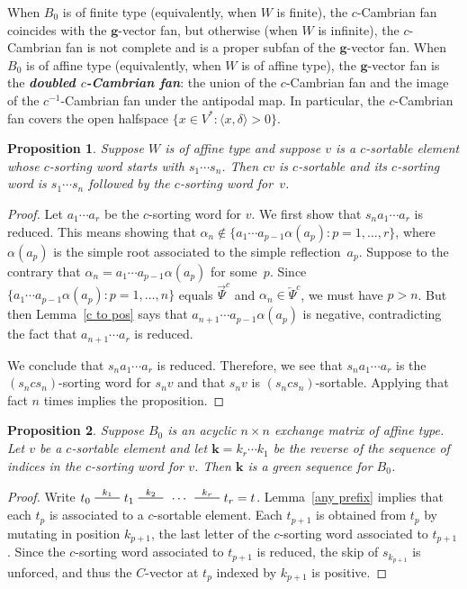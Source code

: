 \documentclass{amsart}
\newtheorem{proposition}{Proposition}[section]
\theoremstyle{definition}
\theoremstyle{remark}
\numberwithin{equation}{section}
\newcommand{\newword}[1]{\textbf{\emph{#1}}}
\newcommand{\edge}{\,\,\rule[2.7pt]{20pt}{0.5pt}\,\,}
\newcommand{\set}[1]{{\lbrace #1 \rbrace}}
\newcommand{\br}[1]{{\langle #1 \rangle}}
\newcommand{\0}{{\mathbf{0}}}
\newcommand{\g}{\mathbf{g}}
\newcommand{\kk}{{\boldsymbol{k}}}
\newcommand{\TravInfChar}{\Psi}
\newcommand{\TravProj}[1]{\overrightarrow{\TravInfChar}^{#1}}
\newcommand{\TravInj}[1]{\overleftarrow{\TravInfChar}^{#1}}
\begin{document}
When $B_0$ is of finite type (equivalently, when $W$ is finite), the $c$-Cambrian fan coincides with the $\g$-vector fan, but otherwise (when $W$ is infinite), the $c$-Cambrian fan is not complete and is a proper subfan of the $\g$-vector fan.
When $B_0$ is of affine type (equivalently, when $W$ is of affine type), the $\g$-vector fan is the \newword{doubled $c$-Cambrian fan}: the union of the \mbox{$c$-Cambrian} fan and the image of the \mbox{$c^{-1}$-Cambrian} fan under the antipodal map.  %
In particular, the $c$-Cambrian fan covers the open halfspace $\set{x\in V^*:\br{x,\delta}>0}$.

\begin{proposition}\label{tack on c}
Suppose $W$ is of affine type and suppose $v$ is a $c$-sortable element whose $c$-sorting word starts with $s_1\cdots s_n$.
Then $cv$ is $c$-sortable and its $c$-sorting word is $s_1\cdots s_n$ followed by the $c$-sorting word for~$v$.
\end{proposition}
\begin{proof}
Let $a_1\cdots a_r$ be the $c$-sorting word for $v$.
We first show that $s_na_1\cdots a_r$ is reduced.
This means showing that $\alpha_n\not\in\set{a_1\cdots a_{p-1}\alpha(a_p):p=1,\ldots,r}$, where $\alpha(a_p)$ is the simple root associated to the simple reflection~$a_p$.
Suppose to the contrary that $\alpha_n=a_1\cdots a_{p-1}\alpha(a_p)$ for some~$p$.
Since $\set{a_1\cdots a_{p-1}\alpha(a_p):p=1,\ldots,n}$ equals $\TravProj{c}$ and $\alpha_n\in \TravInj{c}$, we must have $p>n$.
But then Lemma~\ref{c to pos} says that $a_{n+1}\cdots a_{p-1}\alpha(a_p)$ is negative, contradicting the fact that $a_{n+1}\cdots a_r$ is reduced.

We conclude that $s_na_1\cdots a_r$ is reduced.
Therefore, we see that $s_na_1\cdots a_r$ is the $(s_ncs_n)$-sorting word for $s_nv$ and that $s_nv$ is $(s_ncs_n)$-sortable.
Applying that fact $n$ times implies the proposition.
\end{proof}

\begin{proposition}\label{sort green}
Suppose $B_0$ is an acyclic $n\times n$ exchange matrix of affine type.
Let $v$ be a $c$-sortable element and let $\kk=k_r\cdots k_1$ be the \emph{reverse} of the sequence of indices in the $c$-sorting word for $v$.
Then $\kk$ is a green sequence for $B_0$.
\end{proposition}
\begin{proof}
Write $t_0\overset{k_1}{\edge}t_1\overset{k_2}{\edge}\,\cdots\,\overset{k_r}{\edge}t_r=t$.
Lemma~\ref{any prefix} implies that each $t_p$ is associated to a $c$-sortable element.
Each $t_{p+1}$ is obtained from $t_p$ by mutating in position $k_{p+1}$, the last letter of the $c$-sorting word associated to $t_{p+1}$.
Since the $c$-sorting word associated to $t_{p+1}$ is reduced, the skip of $s_{k_{p+1}}$ is unforced, and thus the $C$-vector at $t_p$ indexed by $k_{p+1}$ is positive.
\end{proof}
\end{document}
